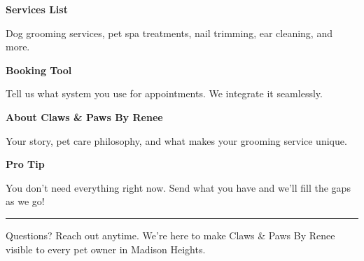 \documentclass[11pt,letterpaper]{article}
\begin{document}
\hfill
\begin{minipage}[t]{0.48\textwidth}
\begin{tcolorbox}[colframe=accent-teal, boxrule=1pt, left=0.7em, right=0.7em, top=0.5em, bottom=0.5em, arc=4pt, boxsep=0pt]
{\bfseries\small\color{accent-teal}Services List}

\vspace{0.15em}

{\small Dog grooming services, pet spa treatments, nail trimming, ear cleaning, and more.}
\end{tcolorbox}

\vspace{0.1em}

\begin{tcolorbox}[colframe=accent-teal, boxrule=1pt, left=0.7em, right=0.7em, top=0.5em, bottom=0.5em, arc=4pt, boxsep=0pt]
{\bfseries\small\color{accent-teal}Booking Tool}

\vspace{0.15em}

{\small Tell us what system you use for appointments. We integrate it seamlessly.}
\end{tcolorbox}

\vspace{0.1em}

\begin{tcolorbox}[colframe=accent-teal, boxrule=1pt, left=0.7em, right=0.7em, top=0.5em, bottom=0.5em, arc=4pt, boxsep=0pt]
{\bfseries\small\color{accent-teal}About Claws \& Paws By Renee}

\vspace{0.15em}

{\small Your story, pet care philosophy, and what makes your grooming service unique.}
\end{tcolorbox}

\vspace{-0.2em}
\end{minipage}

\vspace{0.15em}

\begin{tcolorbox}[colback={accent-red!5}, colframe=accent-red!20, boxrule=0.5pt, left=0.7em, right=0.7em, top=0.4em, bottom=0.4em, arc=6pt, boxsep=0pt]

{\bfseries\small\color{accent-red}Pro Tip}

\vspace{0.1em}

{\small You don't need everything right now. Send what you have and we'll fill the gaps as we go!}

\end{tcolorbox}

\vspace{0.15em}

\noindent\hrule
\vspace{0.2em}

{\small\color{text-light}Questions? Reach out anytime. We're here to make Claws \& Paws By Renee visible to every pet owner in Madison Heights.}
\end{document}
